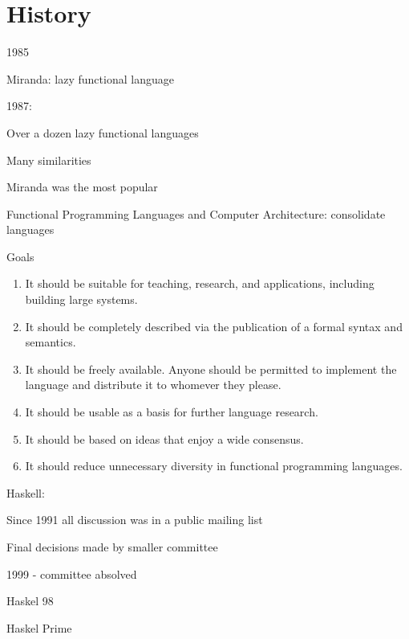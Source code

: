 \section{History}

\frame{\sectionpage}

\begin{frame}
1985

Miranda: lazy functional language
\end{frame}

\begin{frame}
1987:

Over a dozen lazy functional languages

Many similarities

Miranda was the most popular

Functional Programming Languages and Computer Architecture: consolidate languages
\end{frame}

\begin{frame}
Goals

\begin{enumerate}
\item It should be suitable for teaching, research, and applications,
  including building large systems.
\item It should be completely described via the publication of a
  formal syntax and semantics.
\item It should be freely available. Anyone should be permitted to
  implement the language and distribute it to whomever they please.
\item It should be usable as a basis for further language research.
\item It should be based on ideas that enjoy a wide consensus.
\item It should reduce unnecessary diversity in functional programming
  languages.
\end{enumerate}
\end{frame}

\begin{frame}
Haskell:

Since 1991 all discussion was in a public mailing list

Final decisions made by smaller committee

1999 - committee absolved

Haskel 98

Haskel Prime
\end{frame}
